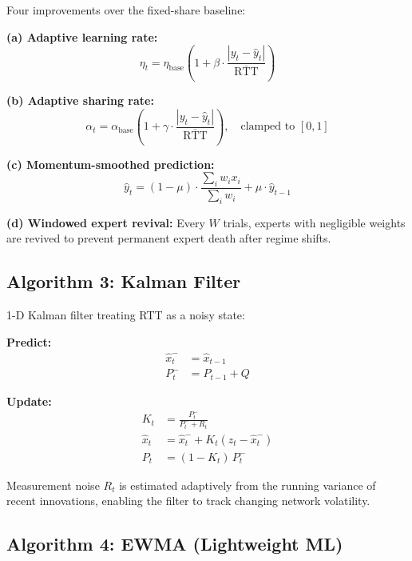 \documentclass[12pt,a4paper]{article}
\begin{document}
Four improvements over the fixed-share baseline:

\textbf{(a) Adaptive learning rate:}
\begin{equation}
    \eta_t = \eta_{\text{base}} \left(1 + \beta \cdot \frac{|y_t - \hat{y}_t|}{\overline{\text{RTT}}}\right)
\end{equation}

\textbf{(b) Adaptive sharing rate:}
\begin{equation}
    \alpha_t = \alpha_{\text{base}} \left(1 + \gamma \cdot \frac{|y_t - \hat{y}_t|}{\overline{\text{RTT}}}\right), \quad \text{clamped to } [0, 1]
\end{equation}

\textbf{(c) Momentum-smoothed prediction:}
\begin{equation}
    \hat{y}_t = (1 - \mu) \cdot \frac{\sum_i w_i x_i}{\sum_i w_i} + \mu \cdot \hat{y}_{t-1}
\end{equation}

\textbf{(d) Windowed expert revival:} Every $W$ trials, experts with negligible weights are revived to prevent permanent expert death after regime shifts.

\subsection{Algorithm 3: Kalman Filter}
\label{sec:algo_kalman}

1-D Kalman filter treating RTT as a noisy state:

\textbf{Predict:}
\begin{align}
    \hat{x}_t^{-} &= \hat{x}_{t-1} \\
    P_t^{-} &= P_{t-1} + Q
\end{align}

\textbf{Update:}
\begin{align}
    K_t &= \frac{P_t^{-}}{P_t^{-} + R_t} \\
    \hat{x}_t &= \hat{x}_t^{-} + K_t (z_t - \hat{x}_t^{-}) \\
    P_t &= (1 - K_t) \, P_t^{-}
\end{align}

Measurement noise $R_t$ is estimated adaptively from the running variance of recent innovations, enabling the filter to track changing network volatility.

\subsection{Algorithm 4: EWMA (Lightweight ML)}
\label{sec:algo_ewma}
\end{document}
